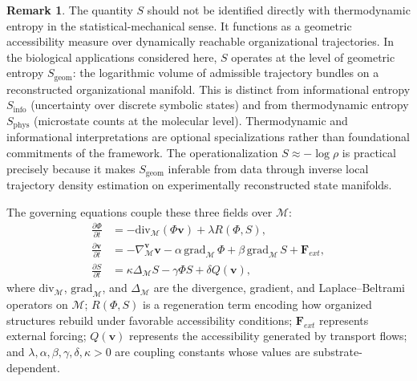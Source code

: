 \documentclass[11pt,a4paper]{article}
\theoremstyle{plain}
\theoremstyle{definition}
\newtheorem{remark}[theorem]{Remark}
\begin{document}
\begin{remark}
The quantity $S$ should not be identified directly with thermodynamic entropy in the
statistical-mechanical sense. It functions as a geometric accessibility measure over
dynamically reachable organizational trajectories. In the biological applications
considered here, $S$ operates at the level of geometric entropy $S_{\mathrm{geom}}$:
the logarithmic volume of admissible trajectory bundles on a reconstructed organizational
manifold. This is distinct from informational entropy $S_{\mathrm{info}}$ (uncertainty
over discrete symbolic states) and from thermodynamic entropy $S_{\mathrm{phys}}$
(microstate counts at the molecular level). Thermodynamic and informational
interpretations are optional specializations rather than foundational commitments of
the framework. The operationalization $S \approx -\log\rho$ is practical precisely
because it makes $S_{\mathrm{geom}}$ inferable from data through inverse local
trajectory density estimation on experimentally reconstructed state manifolds.
\end{remark}

The governing equations couple these three fields over $\mathcal{M}$:
\begin{align}
\frac{\partial \Phi}{\partial t} &= -\mathrm{div}_{\mathcal{M}}(\Phi \mathbf{v})
+ \lambda R(\Phi, S),
\label{eq:phi} \\
\frac{\partial \mathbf{v}}{\partial t} &= -\nabla_{\mathcal{M}}^{\mathbf{v}}\mathbf{v}
- \alpha \,\mathrm{grad}_{\mathcal{M}}\,\Phi
+ \beta \,\mathrm{grad}_{\mathcal{M}}\,S + \mathbf{F}_{ext},
\label{eq:v} \\
\frac{\partial S}{\partial t} &= \kappa \Delta_{\mathcal{M}} S
- \gamma \Phi S + \delta Q(\mathbf{v}),
\label{eq:s}
\end{align}
where $\mathrm{div}_{\mathcal{M}}$, $\mathrm{grad}_{\mathcal{M}}$, and
$\Delta_{\mathcal{M}}$ are the divergence, gradient, and Laplace--Beltrami operators
on $\mathcal{M}$; $R(\Phi, S)$ is a regeneration term encoding how organized structures
rebuild under favorable accessibility conditions; $\mathbf{F}_{ext}$ represents external
forcing; $Q(\mathbf{v})$ represents the accessibility generated by transport flows; and
$\lambda, \alpha, \beta, \gamma, \delta, \kappa > 0$ are coupling constants whose
values are substrate-dependent.
\end{document}
